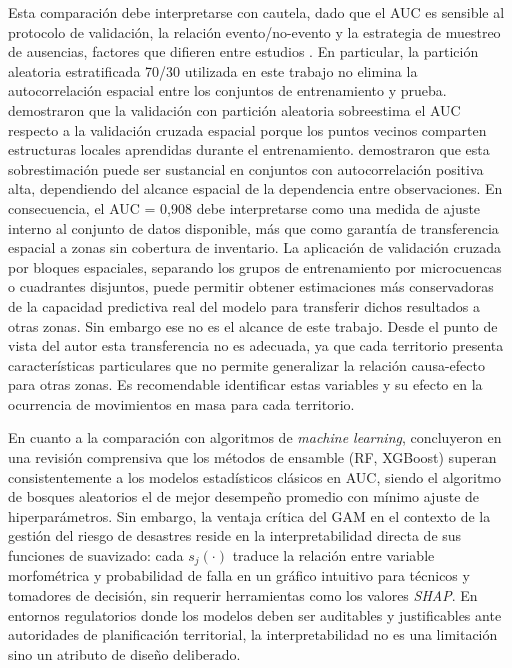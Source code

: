 \documentclass[12pt,a4paper]{article}
\begin{document}
Esta comparación debe interpretarse con cautela, dado que el AUC
es sensible al protocolo de validación, la relación evento/no-evento y
la estrategia de muestreo de ausencias, factores que difieren entre
estudios \citep{reichenbach2018review}. En particular, la partición
aleatoria estratificada 70/30 utilizada en este trabajo no elimina la
autocorrelación espacial entre los conjuntos de entrenamiento y prueba.
\citet{brenning2012spatial} demostraron que la validación con partición
aleatoria sobreestima el AUC respecto a la validación cruzada espacial
porque los puntos vecinos comparten estructuras locales aprendidas
durante el entrenamiento. \citet{Roberts2017} demostraron que esta sobrestimación puede ser
sustancial en conjuntos con autocorrelación positiva alta, dependiendo
del alcance espacial de la dependencia entre observaciones. En consecuencia, el AUC = 0{,}908 debe
interpretarse como una medida de ajuste interno al conjunto de datos
disponible, más que como garantía de transferencia espacial a zonas
sin cobertura de inventario. La aplicación de validación cruzada
por bloques espaciales, separando los grupos de entrenamiento por microcuencas o cuadrantes
disjuntos, puede permitir obtener estimaciones más conservadoras de la capacidad predictiva real del modelo para transferir dichos resultados a otras zonas. Sin embargo ese no es el alcance de este trabajo. Desde el punto de vista del autor esta transferencia no es adecuada, ya que cada territorio presenta características particulares que no permite generalizar la relación causa-efecto para otras zonas. Es recomendable identificar estas variables y su efecto en la ocurrencia de movimientos en masa para cada territorio.

En cuanto a la comparación con algoritmos de \textit{machine learning},
\citet{merghadi2020} concluyeron en una revisión comprensiva que los
métodos de ensamble (RF, XGBoost) superan consistentemente a los
modelos estadísticos clásicos en AUC, siendo el algoritmo de bosques
aleatorios el de mejor desempeño promedio con mínimo ajuste de
hiperparámetros. Sin embargo, la ventaja
crítica del GAM en el contexto de la gestión del riesgo de desastres reside en la
interpretabilidad directa de sus funciones de suavizado: cada
$s_j(\cdot)$ traduce la relación entre variable morfométrica y
probabilidad de falla en un gráfico intuitivo para técnicos y
tomadores de decisión, sin requerir herramientas como los
valores \textit{SHAP}. En entornos regulatorios donde los modelos deben ser
auditables y justificables ante autoridades de planificación territorial,
la interpretabilidad no es una limitación sino un atributo de diseño
deliberado.
\end{document}
